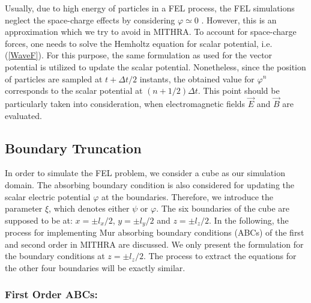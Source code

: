 Usually, due to high energy of particles in a FEL process, the FEL simulations neglect the space-charge effects by considering $\varphi \simeq 0$ \cite{andriyash2015spectral}.
%
However, this is an approximation which we try to avoid in MITHRA.
%
To account for space-charge forces, one needs to solve the Hemholtz equation for scalar potential, i.e. (\ref{WaveF}).
%
For this purpose, the same formulation as used for the vector potential is utilized to update the scalar potential.
%
Nonetheless, since the position of particles are sampled at $t+\Delta t/2$ instants, the obtained value for $\varphi^n$ corresponds to the scalar potential at $(n+1/2)\Delta t$.
%
This point should be particularly taken into consideration, when electromagnetic fields $\vec{E}$ and $\vec{B}$ are evaluated.

\subsection{Boundary Truncation}

In order to simulate the FEL problem, we consider a cube as our simulation domain.
%
The absorbing boundary condition is also considered for updating the scalar electric potential $\varphi$ at the boundaries.
%
Therefore, we introduce the parameter $\xi$, which denotes either $\psi$ or $\varphi$.
%
The six boundaries of the cube are supposed to be at: $x=\pm l_{x}/2 $, $y=\pm l_{y}/2 $ and $z=\pm l_{z}/2 $.
%
In the following, the process for implementing Mur absorbing boundary conditions (ABCs) of the first and second order in MITHRA are discussed.
%
We only present the formulation for the boundary conditions at $z=\pm l_{z}/2 $.
%
The process to extract the equations for the other four boundaries will be exactly similar.

\subsubsection{First Order ABCs:}

